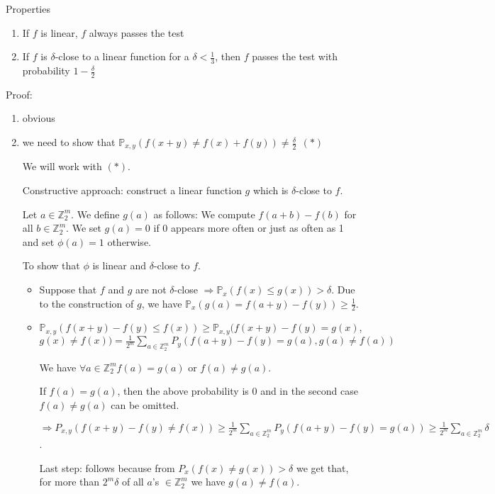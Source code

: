 \documentclass[11pt]{article}
\theoremstyle{definition}
\theoremstyle{definition}
\begin{document}
Properties
\begin{enumerate}
\item If $ f $ is linear, $ f $ always passes the test
\item If $ f $ is $ \delta $-close to a linear function for a $ \delta < \frac{1}{3} $, then $ f $ passes the test with probability $ 1 - \frac{\delta}{2} $
\end{enumerate}

Proof:
\begin{enumerate}
\item obvious
\item we need to show that $ \mathbb{P}_{x, y} (f(x + y) \neq f(x) + f(y)) \neq \frac{\delta}{2} ~~ (\ast) $

	We will work with $ (\ast) $.
	
	Constructive approach: construct a linear function $ g $ which is $ \delta $-close to $ f $.
	
	Let $ a \in \mathbb{Z}_2^m$. We define $ g(a) $ as follows: We compute $ f(a + b) - f(b) $ for all $ b \in \mathbb{Z}_2^m$. We set $ g(a) = 0 $ if 0 appears more often or just as often as 1 and set $ \phi(a) = 1 $ otherwise.
	
	To show that $ \phi $ is linear and $ \delta$-close to $ f $.
	
	\begin{itemize}
	\item Suppose that $ f $ and $ g $ are not $ \delta $-close $ \Rightarrow \mathbb{P}_x(f(x) \leq g(x)) > \delta $. Due to the construction of $ g $, we have $ \mathbb{P}_x(g(a) = f(a + y) - f(y)) \geq \frac{1}{2} $.
	\item  $ \mathbb{P}_{x, y} (f (x + y) - f(y) \leq f(x)) \geq \mathbb{P}_{x, y}(f(x + y) - f(y) = g(x) $, $ g(x) \neq f(x)) = \frac{1}{2^m} \sum \limits_{a \in \mathbb{Z}_2^m} P_y (f (a + y) - f(y) = g(a), g(a) \neq f(a))$
	
	We have $ \forall a \in \mathbb{Z}_2^m f (a) = g(a) $ or $ f(a) \neq g(a) $.
	
	If $ f (a) = g(a) $, then the above probability is 0 and in the second case $ f(a) \neq g(a) $ can be omitted.
	
	$ \Rightarrow P_{x, y} (f (x + y) - f(y) \neq f(x)) \geq \frac{1}{2^m} \sum \limits_{a \in \mathbb{Z}_2^m} P_y(f(a + y) - f(y) = g(a)) \geq \frac{1}{2^m} \sum \limits_{a \in \mathbb{Z}_2^m} \delta $.
	
	Last step: follows because from $ P_x (f (x) \neq g(x)) > \delta $ we get that, for more than $ 2^m \delta $ of all $ a $'s $ \in \mathbb{Z}_2^m $ we have $ g(a) \neq f(a) $.
	

\end{itemize}
\end{enumerate}
\end{document}

